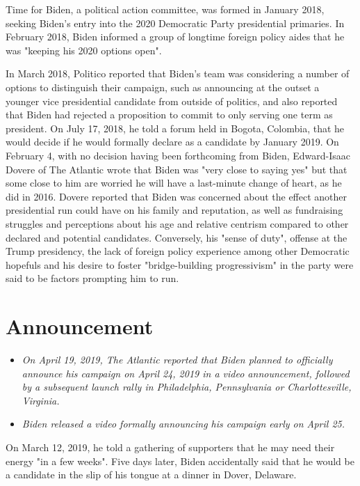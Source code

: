 Time for Biden, a political action committee, was formed in January
2018, seeking Biden's entry into the 2020 Democratic Party presidential
primaries. In February 2018, Biden informed a group of longtime foreign
policy aides that he was "keeping his 2020 options open".

In March 2018, Politico reported that Biden's team was considering a
number of options to distinguish their campaign, such as announcing at
the outset a younger vice presidential candidate from outside of
politics, and also reported that Biden had rejected a proposition to
commit to only serving one term as president. On July 17, 2018, he told
a forum held in Bogota, Colombia, that he would decide if he would
formally declare as a candidate by January 2019. On February 4, with no
decision having been forthcoming from Biden, Edward-Isaac Dovere of The
Atlantic wrote that Biden was "very close to saying yes" but that some
close to him are worried he will have a last-minute change of heart, as
he did in 2016. Dovere reported that Biden was concerned about the
effect another presidential run could have on his family and reputation,
as well as fundraising struggles and perceptions about his age and
relative centrism compared to other declared and potential candidates.
Conversely, his "sense of duty", offense at the Trump presidency, the
lack of foreign policy experience among other Democratic hopefuls and
his desire to foster "bridge-building progressivism" in the party were
said to be factors prompting him to run.

\section{Announcement}\label{announcement}

\begin{itemize}
\item
  \emph{On April 19, 2019, The Atlantic reported that Biden planned to
  officially announce his campaign on April 24, 2019 in a video
  announcement, followed by a subsequent launch rally in Philadelphia,
  Pennsylvania or Charlottesville, Virginia.}
\item
  \emph{Biden released a video formally announcing his campaign early on
  April 25.}
\end{itemize}

On March 12, 2019, he told a gathering of supporters that he may need
their energy "in a few weeks". Five days later, Biden accidentally said
that he would be a candidate in the slip of his tongue at a dinner in
Dover, Delaware.


